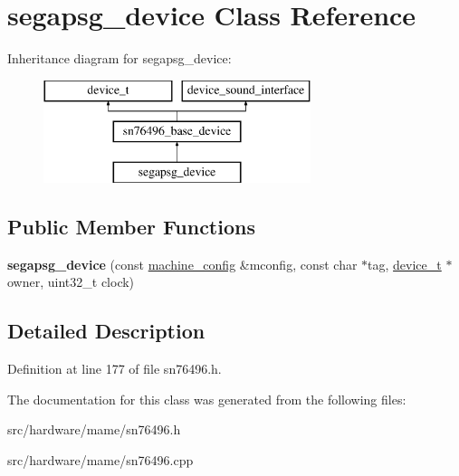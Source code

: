 \hypertarget{classsegapsg__device}{\section{segapsg\-\_\-device Class Reference}
\label{classsegapsg__device}
}
Inheritance diagram for segapsg\-\_\-device\-:\begin{figure}[H]
\begin{center}
\leavevmode
\includegraphics[height=3.000000cm]{classsegapsg__device}
\end{center}
\end{figure}
\subsection*{Public Member Functions}
\begin{DoxyCompactItemize}
\item 
\hypertarget{classsegapsg__device_a5cced95a11acdb89f8d9fd624feb93e3}{{\bfseries segapsg\-\_\-device} (const \hyperlink{structmachine__config}{machine\-\_\-config} \&mconfig, const char $\ast$tag, \hyperlink{classdevice__t}{device\-\_\-t} $\ast$owner, uint32\-\_\-t clock)}\label{classsegapsg__device_a5cced95a11acdb89f8d9fd624feb93e3}

\end{DoxyCompactItemize}


\subsection{Detailed Description}


Definition at line 177 of file sn76496.\-h.



The documentation for this class was generated from the following files\-:\begin{DoxyCompactItemize}
\item 
src/hardware/mame/sn76496.\-h\item 
src/hardware/mame/sn76496.\-cpp\end{DoxyCompactItemize}

